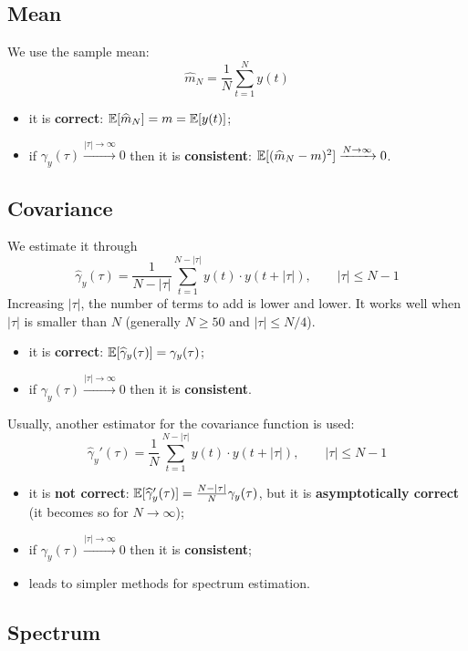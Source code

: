 \subsection{Mean}

We use the sample mean:
\[
	\boxed{\hat{m}_{N}=\frac{1}{N}\sum_{t=1}^{N} y(t)} 
\]
\begin{itemize}
	\item it is \textbf{correct}: $\mathbb{E}[\widehat{m}_{N}]=m=\mathbb{E}[y(t)]$;
	\item if $\gamma _{y}(\tau )\xrightarrow{|\tau|\to\infty} 0$ then it is \textbf{consistent}: $\mathbb{E}[(\widehat{m}_{N}-m)^2]\xrightarrow{N\to\infty} 0$.
\end{itemize}

\subsection{Covariance}

We estimate it through
\[
	\boxed{\hat{\gamma}_{y}(\tau) = \frac{1}{N-|\tau|} \sum_{t=1}^{N-|\tau|} y(t)\cdot y(t+|\tau|), \qquad |\tau|\leq N-1}
\]
Increasing $|\tau|$, the number of terms to add is lower and lower. It works well when $|\tau|$ is smaller than $N$ (generally $N\geq 50$ and $|\tau|\leq N/4$).
\begin{itemize}
	\item it is \textbf{correct}: $\mathbb{E}[\widehat{\gamma}_{y}(\tau)]=\gamma_{y}(\tau)$;
	\item if $\gamma _{y}(\tau )\xrightarrow{|\tau|\to\infty} 0$ then it is \textbf{consistent}.
\end{itemize}

Usually, another estimator for the covariance function is used:
\[
	\boxed{\hat{\gamma}_{y}'(\tau) = \frac{1}{N} \sum_{t=1}^{N-|\tau|} y(t)\cdot y(t+|\tau|), \qquad |\tau|\leq N-1}
\]
\begin{itemize}
	\item it is \textbf{not correct}: $\mathbb{E}[\widehat{\gamma}_{y}'(\tau)]=\frac{N-|\tau|}{N}\gamma _{y}(\tau)$, but it is \textbf{asymptotically correct} (it becomes so for $N\to\infty$);
	\item if $\gamma _{y}(\tau )\xrightarrow{|\tau|\to\infty} 0$ then it is \textbf{consistent};
	\item leads to simpler methods for spectrum estimation.
\end{itemize}

\subsection{Spectrum}

